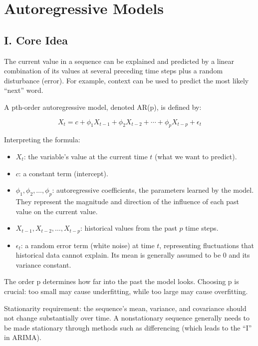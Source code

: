 \setcounter{section}{0}

\hypertarget{autoregressive-models}{%
\section{Autoregressive Models}\label{autoregressive-models}}

\hypertarget{i.-core-idea}{%
\subsection{I. Core Idea}\label{i.-core-idea}}

The current value in a sequence can be explained and predicted by a linear combination of its values at several preceding time steps plus a random disturbance (error). For example, context can be used to predict the most likely ``next'' word.

A pth-order autoregressive model, denoted AR(p), is defined by:

\[
X_t = c + \phi_1 X_{t-1} + \phi_2 X_{t-2} + \cdots + \phi_p X_{t-p} + \epsilon_t
\]

Interpreting the formula:

\begin{itemize}
\tightlist
\item
  \(X_t\): the variable's value at the current time \(t\) (what we want to predict).
\item
  \(c\): a constant term (intercept).
\item
  \(\phi_1, \phi_2, \ldots, \phi_p\): autoregressive coefficients, the parameters learned by the model. They represent the magnitude and direction of the influence of each past value on the current value.
\item
  \(X_{t-1}, X_{t-2}, \ldots, X_{t-p}\): historical values from the past \(p\) time steps.
\item
  \(\epsilon_t\): a random error term (white noise) at time \(t\), representing fluctuations that historical data cannot explain. Its mean is generally assumed to be 0 and its variance constant.
\end{itemize}

The order p determines how far into the past the model looks. Choosing p is crucial: too small may cause underfitting, while too large may cause overfitting.

Stationarity requirement: the sequence's mean, variance, and covariance should not change substantially over time. A nonstationary sequence generally needs to be made stationary through methods such as differencing (which leads to the ``I'' in ARIMA).

